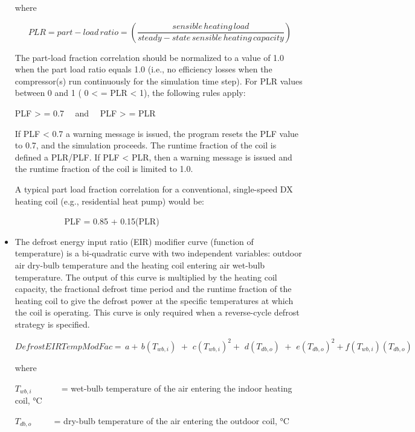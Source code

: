 \begin{itemize}
where

\begin{equation}
PLR = part - load\,ratio = \left( {\frac{{sensible\,heating\,load}}{{steady - state\,sensible\,heating\,capacity}}} \right)
\end{equation}

The part-load fraction correlation should be normalized to a value of 1.0 when the part load ratio equals 1.0 (i.e., no efficiency losses when the compressor(s) run continuously for the simulation time step). For PLR values between 0 and 1 ( 0 \textless{} = PLR \textless{} 1), the following rules apply:

PLF \textgreater{} = 0.7~~ and~~ PLF \textgreater{} = PLR

If PLF \textless{} 0.7 a warning message is issued, the program resets the PLF value to 0.7, and the simulation proceeds. The runtime fraction of the coil is defined a PLR/PLF. If PLF \textless{} PLR, then a warning message is issued and the runtime fraction of the coil is limited to 1.0.

A typical part load fraction correlation for a conventional, single-speed DX heating coil (e.g., residential heat pump) would be:

~~~~~~~~~~~ PLF = 0.85 + 0.15(PLR)

  \item
The defrost energy input ratio (EIR) modifier curve (function of temperature) is a bi-quadratic curve with two independent variables: outdoor air dry-bulb temperature and the heating coil entering air wet-bulb temperature. The output of this curve is multiplied by the heating coil capacity, the fractional defrost time period and the runtime fraction of the heating coil to give the defrost power at the specific temperatures at which the coil is operating. This curve is only required when a reverse-cycle defrost strategy is specified.

\begin{equation}
DefrostEIRTempModFac = \,a + \,b\left( {{T_{wb,i}}} \right)\,\, + \,\,c{\left( {{T_{wb,i}}} \right)^2} + \,\,d\left( {{T_{db,o}}} \right)\,\, + \,\,e{\left( {{T_{db,o}}} \right)^2} + f\left( {{T_{wb,i}}} \right)\left( {{T_{db,o}}} \right)
\end{equation}

where

\({T_{wb,i}}\) ~~~~ ~ = wet-bulb temperature of the air entering the indoor heating coil, °C

\({T_{db,o}}\) ~~~~ = dry-bulb temperature of the air entering the outdoor coil, °C
\end{itemize}


